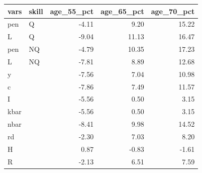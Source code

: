 \begin{tabular}{llrrr}
  \hline
vars & skill & age\_55\_pct & age\_65\_pct & age\_70\_pct \\ 
  \hline
pen & Q & -4.11 & 9.20 & 15.22 \\ 
  L & Q & -9.04 & 11.13 & 16.47 \\ 
  pen & NQ & -4.79 & 10.35 & 17.23 \\ 
  L & NQ & -7.81 & 8.89 & 12.68 \\ 
  y &  & -7.56 & 7.04 & 10.98 \\ 
  c &  & -7.86 & 7.49 & 11.57 \\ 
  I &  & -5.56 & 0.50 & 3.15 \\ 
  kbar &  & -5.56 & 0.50 & 3.15 \\ 
  nbar &  & -8.41 & 9.98 & 14.52 \\ 
  rd &  & -2.30 & 7.03 & 8.20 \\ 
  H &  & 0.87 & -0.83 & -1.61 \\ 
  R &  & -2.13 & 6.51 & 7.59 \\ 
   \hline
\end{tabular}
